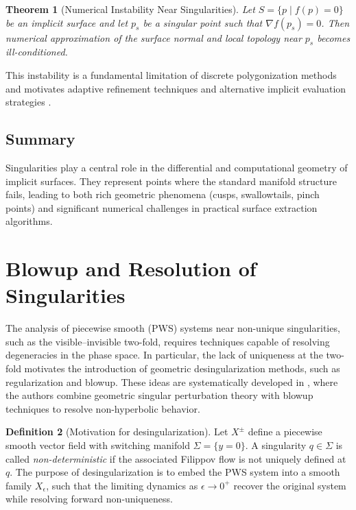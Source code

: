 \documentclass[12pt, a4paper, oneside]{book}
\theoremstyle{plain}
\newtheorem{theorem}{Theorem}[chapter]
\theoremstyle{definition}
\newtheorem{definition}[theorem]{Definition}
\theoremstyle{remark}
\theoremstyle{definition}
\begin{document}
\begin{theorem}[Numerical Instability Near Singularities]
Let $S = \{p \mid f(p)=0\}$ be an implicit surface and let $p_s$ be a singular point such that $\nabla f(p_s)=0$. Then numerical approximation of the surface normal and local topology near $p_s$ becomes ill-conditioned.
\end{theorem}

This instability is a fundamental limitation of discrete polygonization methods and motivates adaptive refinement techniques and alternative implicit evaluation strategies \cite{bloomenthal2000implicit}.

\subsection*{Summary}

Singularities play a central role in the differential and computational geometry of implicit surfaces. They represent points where the standard manifold structure fails, leading to both rich geometric phenomena (cusps, swallowtails, pinch points) and significant numerical challenges in practical surface extraction algorithms.

\section{Blowup and Resolution of Singularities}

The analysis of piecewise smooth (PWS) systems near non-unique singularities, such as the visible–invisible two-fold, requires techniques capable of resolving degeneracies in the phase space. In particular, the lack of uniqueness at the two-fold motivates the introduction of geometric desingularization methods, such as regularization and blowup. These ideas are systematically developed in \cite{kristiansen2019resolution}, where the authors combine geometric singular perturbation theory with blowup techniques to resolve non-hyperbolic behavior.

\begin{definition}[Motivation for desingularization]
Let $X^\pm$ define a piecewise smooth vector field with switching manifold $\Sigma = \{y=0\}$. A singularity $q \in \Sigma$ is called \emph{non-deterministic} if the associated Filippov flow is not uniquely defined at $q$. The purpose of desingularization is to embed the PWS system into a smooth family $X_\epsilon$, such that the limiting dynamics as $\epsilon \to 0^+$ recover the original system while resolving forward non-uniqueness.
\end{definition}
\end{document}
